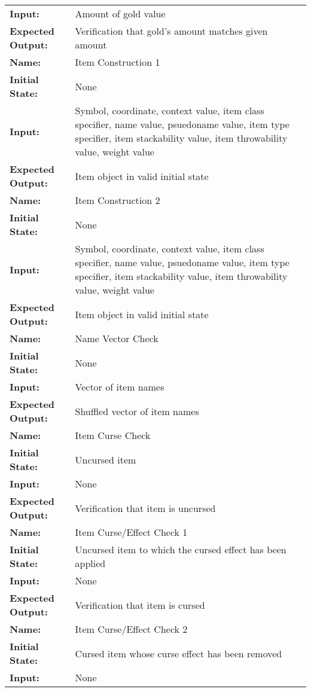 \documentclass[12pt, titlepage]{article}
\begin{document}
\begin{center}
\begin{longtable}{ l | p{10cm} }
				\textbf{Input:} & Amount of gold value\\
				\textbf{Expected Output:} & Verification that gold's amount matches given amount\\
				\hline
				\textbf{Name:} & Item Construction 1\\
				\textbf{Initial State:} & None\\
				\textbf{Input:} & Symbol, coordinate, context value, item class specifier, name value, psuedoname value, item type specifier, item stackability value, item throwability value, weight value\\
				\textbf{Expected Output:} & Item object in valid initial state\\
				\textbf{Name:} & Item Construction 2\\
				\textbf{Initial State:} & None\\
				\textbf{Input:} & Symbol, coordinate, context value, item class specifier, name value, psuedoname value, item type specifier, item stackability value, item throwability value, weight value\\
				\textbf{Expected Output:} & Item object in valid initial state\\
				\hline
				\textbf{Name:} & Name Vector Check\\
				\textbf{Initial State:} & None\\
				\textbf{Input:} & Vector of item names\\
				\textbf{Expected Output:} & Shuffled vector of item names\\
				\hline
				\textbf{Name:} & Item Curse Check\\
				\textbf{Initial State:} & Uncursed item\\
				\textbf{Input:} & None\\
				\textbf{Expected Output:} & Verification that item is uncursed\\
				\hline
				\textbf{Name:} & Item Curse/Effect Check 1\\
				\textbf{Initial State:} & Uncursed item to which the cursed effect has been applied\\
				\textbf{Input:} & None\\
				\textbf{Expected Output:} & Verification that item is cursed\\
				\hline
				\textbf{Name:} & Item Curse/Effect Check 2\\
				\textbf{Initial State:} & Cursed item whose curse effect has been removed\\
				\textbf{Input:} & None\\

\end{longtable}
\end{center}
\end{document}
